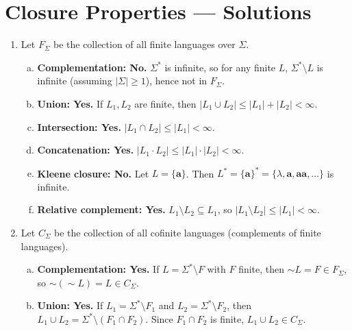 
\chapter{Closure Properties --- Solutions}

\begin{enumerate}[{5.}1. ]

\item Let $F_\Sigma$ be the collection of all finite languages over $\Sigma$.

\begin{enumerate}[(a)]
  \item \textbf{Complementation: No.}  $\Sigma^*$ is infinite, so for any finite $L$,
  $\Sigma^*\setminus L$ is infinite (assuming $|\Sigma|\ge 1$), hence not in $F_\Sigma$.

  \item \textbf{Union: Yes.}  If $L_1,L_2$ are finite, then $|L_1\cup L_2|\le|L_1|+|L_2|<\infty$.

  \item \textbf{Intersection: Yes.}  $|L_1\cap L_2|\le|L_1|<\infty$.

  \item \textbf{Concatenation: Yes.}  $|L_1\cdot L_2|\le|L_1|\cdot|L_2|<\infty$.

  \item \textbf{Kleene closure: No.}  Let $L=\{\pmb{a}\}$.  Then $L^*=\{\pmb{a}\}^*=\{\lambda,\pmb{a},\pmb{aa},\ldots\}$ is infinite.

  \item \textbf{Relative complement: Yes.}  $L_1\setminus L_2\subseteq L_1$, so $|L_1\setminus L_2|\le|L_1|<\infty$.
\end{enumerate}

\item Let $C_\Sigma$ be the collection of all cofinite languages (complements of finite languages).

\begin{enumerate}[(a)]
  \item \textbf{Complementation: Yes.}  If $L=\Sigma^*\setminus F$ with $F$ finite, then $\sim L=F\in F_\Sigma$, so $\sim(\sim L)=L\in C_\Sigma$.

  \item \textbf{Union: Yes.}  If $L_1=\Sigma^*\setminus F_1$ and $L_2=\Sigma^*\setminus F_2$, then $L_1\cup L_2=\Sigma^*\setminus(F_1\cap F_2)$.  Since $F_1\cap F_2$ is finite, $L_1\cup L_2\in C_\Sigma$.


\end{enumerate}
\end{enumerate}
